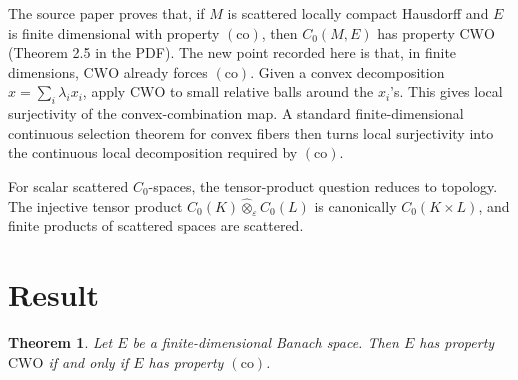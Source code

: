 \documentclass[11pt]{article}
\newtheorem{theorem}{Theorem}
\newcommand{\CWO}{\mathrm{CWO}}
\newcommand{\co}{\mathrm{(co)}}
\newcommand{\eps}{\varepsilon}
\begin{document}
The source paper proves that, if \(M\) is scattered locally compact
Hausdorff and \(E\) is finite dimensional with property \(\co\), then
\(C_0(M,E)\) has property \(\CWO\) (Theorem 2.5 in the PDF). The new point
recorded here is that, in finite dimensions, \(\CWO\) already forces
\(\co\). Given a convex decomposition \(x=\sum_i\lambda_i x_i\), apply
\(\CWO\) to small relative balls around the \(x_i\)'s. This gives local
surjectivity of the convex-combination map. A standard finite-dimensional
continuous selection theorem for convex fibers then turns local
surjectivity into the continuous local decomposition required by \(\co\).

For scalar scattered \(C_0\)-spaces, the tensor-product question reduces to
topology. The injective tensor product
\(C_0(K)\widehat{\otimes}_{\eps} C_0(L)\) is canonically \(C_0(K\times L)\),
and finite products of scattered spaces are scattered.

\section*{Result}

\begin{theorem}
Let \(E\) be a finite-dimensional Banach space. Then \(E\) has property
\(\CWO\) if and only if \(E\) has property \(\co\).
\end{theorem}
\end{document}
